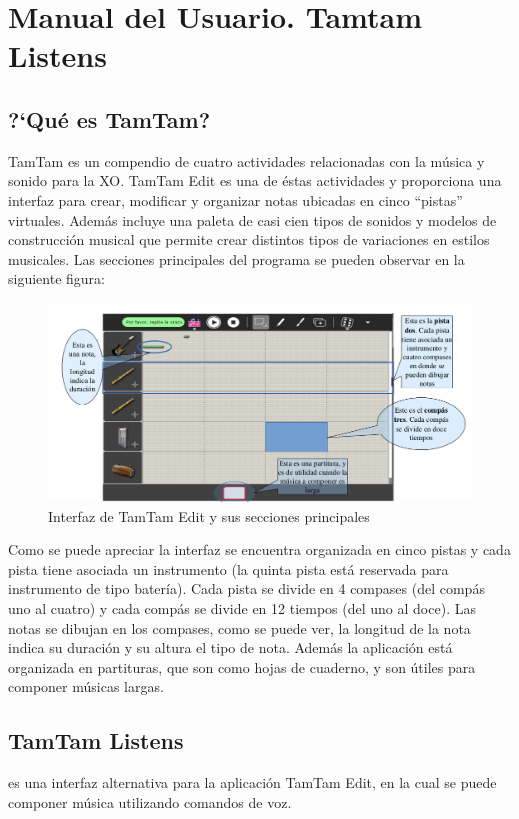\section{Manual del Usuario. Tamtam Listens}

\subsection{{?`}Qu\'e es TamTam?}

TamTam es un compendio de cuatro actividades relacionadas con la m\'usica y sonido para la XO.
TamTam Edit es una de \'estas actividades y proporciona una interfaz para crear, modificar y organizar
notas ubicadas en cinco ``pistas'' virtuales. Adem\'as incluye una paleta de casi cien tipos de sonidos y
modelos de construcci\'on musical que permite crear distintos tipos de variaciones en estilos musicales.
Las secciones principales del programa se pueden observar en la siguiente figura:


\begin{figure}[H] 
\centering
\includegraphics[width=1\textwidth]{./graphics/ui-tamtam.png}
\caption{Interfaz de TamTam Edit y sus secciones principales}
\label{figure:ui-tamtam-anexo}
\end{figure}

Como se puede apreciar la interfaz se encuentra organizada en cinco pistas y cada pista tiene asociada
un instrumento (la quinta pista est\'a reservada para instrumento de tipo bater\'ia). Cada pista se divide en
4 compases (del comp\'as uno al cuatro) y cada comp\'as se divide en 12 tiempos (del uno al doce). Las
notas se dibujan en los compases, como se puede ver, la longitud de la nota indica su duraci\'on y su
altura el tipo de nota.  Adem\'as la aplicaci\'on est\'a organizada en partituras, que son como hojas  de
cuaderno, y son \'utiles para componer m\'usicas largas.

\subsection{TamTam Listens}
 es una interfaz alternativa para la aplicaci\'on TamTam Edit, en la cual se puede
componer m\'usica utilizando comandos de voz. 

